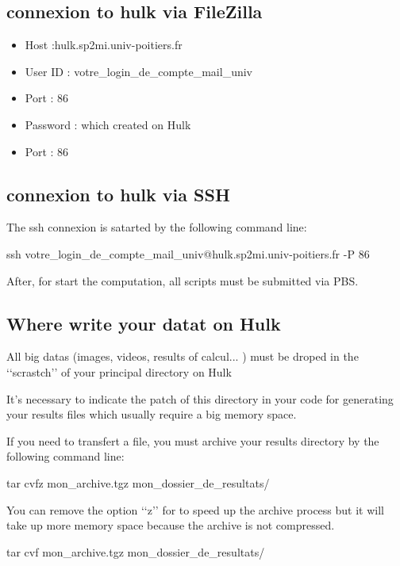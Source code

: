 \documentclass[12pt]{article}
\begin{document}
\subsection{connexion to hulk via FileZilla}

\begin{itemize}
	\item	 Host :hulk.sp2mi.univ-poitiers.fr
	\item	User ID : votre\_login\_de\_compte\_mail\_univ 
	\item	Port : 86
	\item	Password : which created on Hulk 
	\item	Port : 86
\end{itemize}

\subsection{connexion to hulk via SSH}
The ssh connexion is satarted by the following command line:
  
ssh votre\_login\_de\_compte\_mail\_univ@hulk.sp2mi.univ-poitiers.fr -P 86

After, for start the computation, all scripts must be submitted via PBS.

\subsection{Where write your datat on Hulk}

All big datas (images, videos, results of calcul... ) must be droped in the \lq\lq{}scrastch\rq\rq{} of your principal directory on Hulk

It\rq{}s necessary to indicate the  patch of this directory in your code for generating your results files which usually require a big memory space. 

If you need to transfert a file, you must archive your results directory  by the following command line:

tar cvfz mon\_archive.tgz mon\_dossier\_de\_resultats/

You can remove the option \lq\lq{}z\rq\rq{} for to speed up the archive process but it will take up more memory space because the archive is not compressed.

tar cvf mon\_archive.tgz mon\_dossier\_de\_resultats/



 
\end{document}
